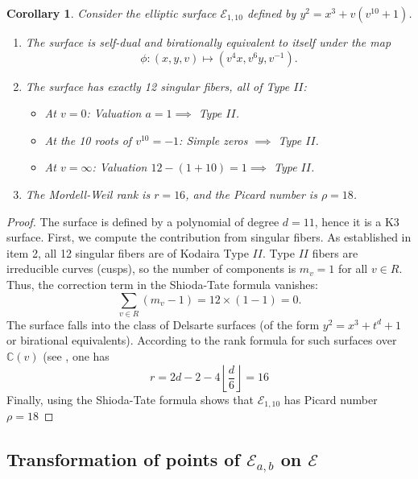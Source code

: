\documentclass[11pt]{amsart}
\newcommand{\Ee}{{\mathcal E}}
\newtheorem{cor}[thm]{Corollary}
\numberwithin{equation}{section}
\numberwithin{table}{section}
\newcommand\<{\langle}
\begin{document}
\begin{cor}
	\label{cor:E1_10}
	Consider the elliptic surface $\Ee_{1,10}$ defined by $y^2 = x^3 + v(v^{10}+1)$.
	\begin{enumerate}
		\item  The  surface is self-dual and birationally equivalent to itself under the map
		$$\phi: (x, y, v) \mapsto (v^{4}x, v^{6}y, v^{-1}).$$
		\item   The surface has exactly 12 singular fibers, all of Type $II$:
		\begin{itemize}
			\item At $v=0$: Valuation $a=1 \implies$ Type $II$.
			\item At the 10 roots of $v^{10}=-1$: Simple zeros $\implies$ Type $II$.
			\item At $v=\infty$: Valuation $12-(1+10)=1 \implies$ Type $II$.
		\end{itemize}
		\item  The Mordell-Weil rank is $r = 16$, and the Picard number is $\rho = 18$.
	\end{enumerate}
\end{cor}

\begin{proof}
	The surface is defined by a polynomial of degree $d=11$, hence it is a K3 surface.
	First, we compute the contribution from singular fibers. As established in item 2, all 12 singular fibers are of Kodaira Type $II$. Type $II$ fibers are irreducible curves (cusps), so the number of components is $m_v = 1$ for all $v \in R$. Thus, the correction term in the Shioda-Tate formula vanishes:
	\[
	\sum_{v \in R} (m_v - 1) = 12 \times (1-1) = 0.
	\]
 The surface falls into the class of Delsarte surfaces (of the form $y^2 = x^3 + t^d + 1$ or birational equivalents). According to the rank formula for such surfaces over $\mathbb{C}(v)$ (see \cite[Section 13.2.2]{Schuett2019}, one has
	\[
	r = 2d - 2 - 4 \left\lfloor \frac{d}{6} \right\rfloor= 16
	\]
	Finally, using the Shioda-Tate formula shows
 that $\Ee_{1, 10}$ has   Picard number $\rho = 18$
\end{proof}








\subsection{Transformation of points of $\Ee_{a,b}$ on $\Ee$}
\end{document}
